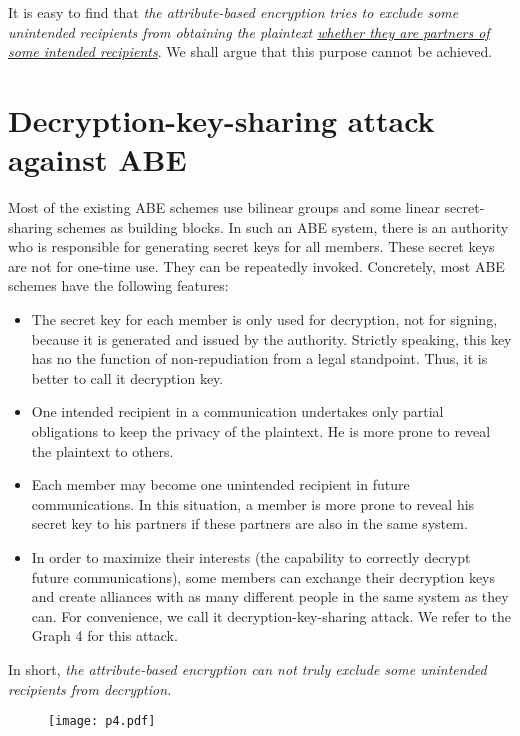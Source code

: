 \documentclass[11pt]{article}
\begin{document}
 It is easy to find that  \emph{the attribute-based encryption tries to exclude some unintended recipients from obtaining the plaintext \underline{whether they are partners of some intended recipients}}. We shall argue that this purpose cannot be achieved.


\section{Decryption-key-sharing attack against ABE}

Most of the existing ABE schemes use bilinear groups and  some linear secret-sharing schemes as building blocks. In such an ABE system, there is an authority who is responsible for generating secret keys for all members. These secret keys are not for one-time use. They can be repeatedly invoked. Concretely, most ABE schemes have the following features:

\begin{itemize}
\item{} The secret key for each member is only used for decryption, not for signing,  because it is generated and issued by the authority. Strictly speaking,  this key has no the function of non-repudiation from a legal standpoint. Thus, it is better to call it decryption key.

\item{} One intended recipient in a communication undertakes only partial obligations to keep the privacy of the plaintext. He is more prone to reveal the plaintext to others.

\item{} Each member may become one unintended recipient in future communications. In this situation, a member is more prone to reveal his secret key to his partners if these partners are also in the same system.

\item{} In order to maximize their interests (the capability to correctly decrypt future communications),
some members can exchange their decryption keys and create alliances with as many different people in the same system as they can. For convenience, we call it decryption-key-sharing attack. We refer to the Graph 4 for this attack.
\end{itemize}

In short, \emph{the attribute-based encryption can not truly exclude some unintended recipients from decryption.}

\begin{figure}[htbp]
\begin{minipage}[t]{.9\textwidth}
\hspace*{20mm} \texttt{[image: p4.pdf]}
\end{minipage}
\end{figure}
\end{document}

